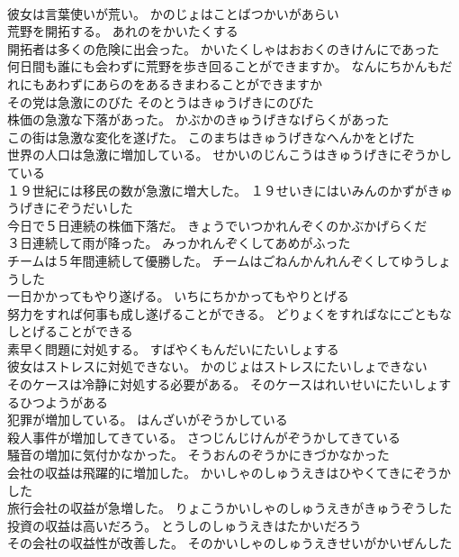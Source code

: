 \documentclass[8pt]{extreport}
\begin{document}
\begin{CJK}{UTF8}{min}
\\	彼女は言葉使いが荒い。	かのじょはことばつかいがあらい 
\\	荒野を開拓する。	あれのをかいたくする 
\\	開拓者は多くの危険に出会った。	かいたくしゃはおおくのきけんにであった 
\\	何日間も誰にも会わずに荒野を歩き回ることができますか。	なんにちかんもだれにもあわずにあらのをあるきまわることができますか 
\\	その党は急激にのびた	そのとうはきゅうげきにのびた 
\\	株価の急激な下落があった。	かぶかのきゅうげきなげらくがあった 
\\	この街は急激な変化を遂げた。	このまちはきゅうげきなへんかをとげた 
\\	世界の人口は急激に増加している。	せかいのじんこうはきゅうげきにぞうかしている 
\\	１９世紀には移民の数が急激に増大した。	１９せいきにはいみんのかずがきゅうげきにぞうだいした 
\\	今日で５日連続の株価下落だ。	きょうでいつかれんぞくのかぶかげらくだ 
\\	３日連続して雨が降った。	みっかれんぞくしてあめがふった 
\\	チームは５年間連続して優勝した。	チームはごねんかんれんぞくしてゆうしょうした 
\\	一日かかってもやり遂げる。	いちにちかかってもやりとげる 
\\	努力をすれば何事も成し遂げることができる。	どりょくをすればなにごともなしとげることができる 
\\	素早く問題に対処する。	すばやくもんだいにたいしょする 
\\	彼女はストレスに対処できない。	かのじょはストレスにたいしょできない 
\\	そのケースは冷静に対処する必要がある。	そのケースはれいせいにたいしょするひつようがある 
\\	犯罪が増加している。	はんざいがぞうかしている 
\\	殺人事件が増加してきている。	さつじんじけんがぞうかしてきている 
\\	騒音の増加に気付かなかった。	そうおんのぞうかにきづかなかった 
\\	会社の収益は飛躍的に増加した。	かいしゃのしゅうえきはひやくてきにぞうかした 
\\	旅行会社の収益が急増した。	りょこうかいしゃのしゅうえきがきゅうぞうした 
\\	投資の収益は高いだろう。	とうしのしゅうえきはたかいだろう 
\\	その会社の収益性が改善した。	そのかいしゃのしゅうえきせいがかいぜんした 

\end{CJK}
\end{document}
